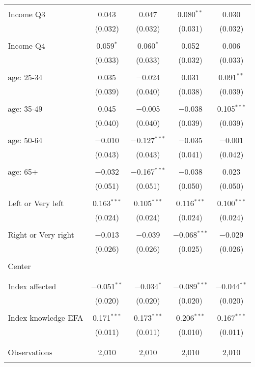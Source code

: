 \begin{tabular}{@{\extracolsep{5pt}}lcccc}
  & & & & \\ 
 Income Q3 & 0.043 & 0.047 & 0.080$^{**}$ & 0.030 \\ 
  & (0.032) & (0.032) & (0.031) & (0.032) \\ 
  & & & & \\ 
 Income Q4 & 0.059$^{*}$ & 0.060$^{*}$ & 0.052 & 0.006 \\ 
  & (0.033) & (0.033) & (0.032) & (0.033) \\ 
  & & & & \\ 
 age: 25-34 & 0.035 & $-$0.024 & 0.031 & 0.091$^{**}$ \\ 
  & (0.039) & (0.040) & (0.038) & (0.039) \\ 
  & & & & \\ 
 age: 35-49 & 0.045 & $-$0.005 & $-$0.038 & 0.105$^{***}$ \\ 
  & (0.040) & (0.040) & (0.039) & (0.039) \\ 
  & & & & \\ 
 age: 50-64 & $-$0.010 & $-$0.127$^{***}$ & $-$0.035 & $-$0.001 \\ 
  & (0.043) & (0.043) & (0.041) & (0.042) \\ 
  & & & & \\ 
 age: 65+ & $-$0.032 & $-$0.167$^{***}$ & $-$0.038 & 0.023 \\ 
  & (0.051) & (0.051) & (0.050) & (0.050) \\ 
  & & & & \\ 
 Left or Very left & 0.163$^{***}$ & 0.105$^{***}$ & 0.116$^{***}$ & 0.100$^{***}$ \\ 
  & (0.024) & (0.024) & (0.024) & (0.024) \\ 
  & & & & \\ 
 Right or Very right & $-$0.013 & $-$0.039 & $-$0.068$^{***}$ & $-$0.029 \\ 
  & (0.026) & (0.026) & (0.025) & (0.026) \\ 
  & & & & \\ 
 Center &  &  &  &  \\ 
  &  &  &  &  \\ 
  & & & & \\ 
 Index affected & $-$0.051$^{**}$ & $-$0.034$^{*}$ & $-$0.089$^{***}$ & $-$0.044$^{**}$ \\ 
  & (0.020) & (0.020) & (0.020) & (0.020) \\ 
  & & & & \\ 
 Index knowledge EFA & 0.171$^{***}$ & 0.173$^{***}$ & 0.206$^{***}$ & 0.167$^{***}$ \\ 
  & (0.011) & (0.011) & (0.010) & (0.011) \\ 
  & & & & \\ 
\hline \\[-1.8ex] 

Observations & 2,010 & 2,010 & 2,010 & 2,010 \\ 
\hline 
\hline \\[-1.8ex] 
\end{tabular} 